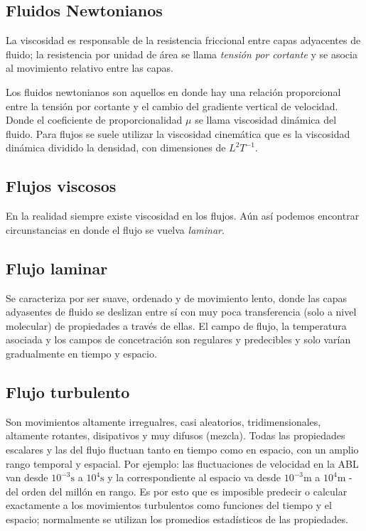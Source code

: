 \documentclass[openany]{book}
\begin{document}
\subsection{Fluidos Newtonianos}
La viscosidad es responsable de la resistencia friccional entre capas adyacentes de fluido; la resistencia por unidad de área se llama \emph{tensión por cortante} y se asocia al movimiento relativo entre las capas.

Los fluidos newtonianos son aquellos en donde hay una relación 
proporcional entre la tensión por cortante y el cambio del 
gradiente vertical de velocidad. Donde el coeficiente de 
proporcionalidad $\mu$ se llama viscosidad dinámica del fluido. 
Para flujos se suele utilizar la viscosidad cinemática que es la 
viscosidad dinámica dividido la densidad, con dimensiones de 
$L^2 T^{-1}$.

\subsection{Flujos viscosos}

En la realidad siempre existe viscosidad en los flujos. Aún 
así podemos encontrar circunstancias en donde el flujo se 
vuelva \emph{laminar}.

\subsection{Flujo laminar}

Se caracteriza por ser suave, ordenado y de movimiento lento, donde 
las capas adyasentes de fluido se deslizan entre sí con muy poca 
transferencia (solo a nivel molecular) de propiedades a través de 
ellas. El campo de flujo, la temperatura asociada y los campos de 
concetración son regulares y predecibles y solo varían gradualmente 
en tiempo y espacio.

\subsection{Flujo turbulento}

Son movimientos altamente irregualres, casi aleatorios, 
tridimensionales, altamente rotantes, disipativos y muy difusos 
(mezcla). Todas las propiedades escalares y las del flujo 
fluctuan tanto en tiempo como en espacio, con un amplio rango 
temporal y espacial. Por ejemplo: las fluctuaciones de velocidad en 
la ABL van desde $10^{-3}\mathrm{s}$ a $10^4\mathrm{s}$ y la 
correspondiente al espacio va desde $10^{-3}\mathrm{m}$ a 
$10^4\mathrm{m}$ - del orden del millón en rango. Es por esto 
que es imposible predecir o calcular exactamente a los movimientos 
turbulentos como funciones del tiempo y el espacio; normalmente 
se utilizan los promedios estadísticos de las propiedades.
\end{document}
